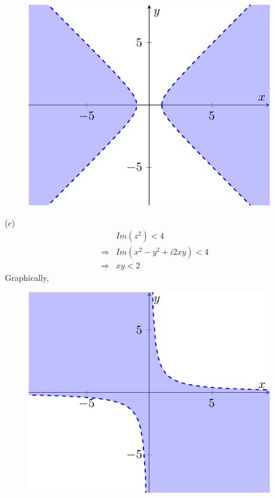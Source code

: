 \begin{ex}
\begin{figure}[ht!]
        \includegraphics[scale=0.9]{FIG_MAT215/FIG12.pdf}
        \label{fig 12}
    \end{figure}
    \FloatBarrier
    \noindent (c) \begin{align*}
        & Im(z^2) < 4\\
        \Rightarrow & Im(x^2-y^2+i2xy)<4 \\
        \Rightarrow & xy <2
    \end{align*}
    Graphically, \begin{figure}[ht!]
        \centering
        \includegraphics{FIG_MAT215/FIG13.pdf}
        \label{fig 13}
    \end{figure}
    \FloatBarrier
\end{ex}

